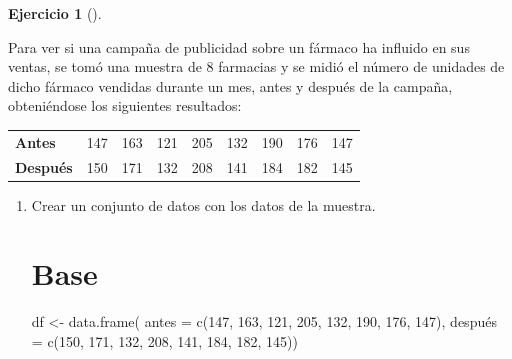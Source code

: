 \documentclass[
  a4paper,
]{scrreport}
\newenvironment{Shaded}{\begin{snugshade}}{\end{snugshade}}
\newcommand{\AttributeTok}[1]{\textcolor[rgb]{0.40,0.45,0.13}{#1}}
\newcommand{\DecValTok}[1]{\textcolor[rgb]{0.68,0.00,0.00}{#1}}
\newcommand{\FunctionTok}[1]{\textcolor[rgb]{0.28,0.35,0.67}{#1}}
\newcommand{\NormalTok}[1]{\textcolor[rgb]{0.00,0.23,0.31}{#1}}
\newcommand{\OtherTok}[1]{\textcolor[rgb]{0.00,0.23,0.31}{#1}}
\theoremstyle{definition}
\newtheorem{exercise}{Ejercicio}[chapter]
\theoremstyle{remark}
\begin{document}
\begin{exercise}[]\protect\hypertarget{exr-intervalo-diferencia-medias-datos-pareados-campaña-publicidad}{}\label{exr-intervalo-diferencia-medias-datos-pareados-campaña-publicidad}

Para ver si una campaña de publicidad sobre un fármaco ha influido en
sus ventas, se tomó una muestra de 8 farmacias y se midió el número de
unidades de dicho fármaco vendidas durante un mes, antes y después de la
campaña, obteniéndose los siguientes resultados:

\begin{longtable}[]{@{}lllllllll@{}}
\toprule\noalign{}
\endhead
\bottomrule\noalign{}
\endlastfoot
\textbf{Antes} & 147 & 163 & 121 & 205 & 132 & 190 & 176 & 147 \\
\textbf{Después} & 150 & 171 & 132 & 208 & 141 & 184 & 182 & 145 \\
\end{longtable}

\begin{enumerate}
\def\labelenumi{\alph{enumi}.}
\item
  Crear un conjunto de datos con los datos de la muestra.

  \begin{tcolorbox}[enhanced jigsaw, colframe=quarto-callout-tip-color-frame, toprule=.15mm, bottomtitle=1mm, breakable, opacitybacktitle=0.6, toptitle=1mm, colback=white, bottomrule=.15mm, title=\textcolor{quarto-callout-tip-color}{\faLightbulb}\hspace{0.5em}{Solución}, arc=.35mm, left=2mm, titlerule=0mm, rightrule=.15mm, coltitle=black, leftrule=.75mm, opacityback=0, colbacktitle=quarto-callout-tip-color!10!white]

  \section{Base}

\begin{Shaded}
\begin{Highlighting}[]
\NormalTok{df }\OtherTok{\textless{}{-}} \FunctionTok{data.frame}\NormalTok{(}
    \AttributeTok{antes =} \FunctionTok{c}\NormalTok{(}\DecValTok{147}\NormalTok{, }\DecValTok{163}\NormalTok{, }\DecValTok{121}\NormalTok{, }\DecValTok{205}\NormalTok{, }\DecValTok{132}\NormalTok{, }\DecValTok{190}\NormalTok{, }\DecValTok{176}\NormalTok{, }\DecValTok{147}\NormalTok{),}
\NormalTok{    después }\OtherTok{=} \FunctionTok{c}\NormalTok{(}\DecValTok{150}\NormalTok{, }\DecValTok{171}\NormalTok{, }\DecValTok{132}\NormalTok{, }\DecValTok{208}\NormalTok{, }\DecValTok{141}\NormalTok{, }\DecValTok{184}\NormalTok{, }\DecValTok{182}\NormalTok{, }\DecValTok{145}\NormalTok{))}
\end{Highlighting}
\end{Shaded}


\end{tcolorbox}
\end{enumerate}
\end{exercise}
\end{document}
